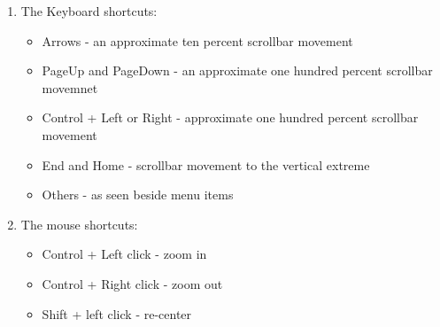 \begin{enumerate}
\item The Keyboard shortcuts: 

\begin{itemize}
\item Arrows - an approximate ten percent scrollbar movement
\item PageUp and PageDown - an approximate one hundred percent scrollbar movemnet 
\item Control + Left or Right - approximate one hundred percent scrollbar movement 
\item End and Home - scrollbar movement to the vertical extreme 
\item Others - as seen beside menu items
\end{itemize}

\item The mouse shortcuts: 

\begin{itemize}
\item Control + Left click - zoom in 
\item Control + Right click - zoom out
\item Shift + left click - re-center
\end{itemize}
\end{enumerate}
 

